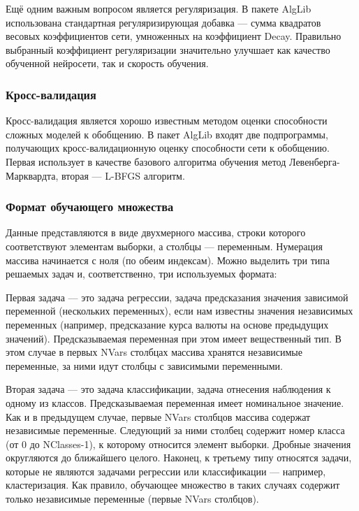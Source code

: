 Ещё одним важным вопросом является регуляризация. В пакете AlgLib использована
стандартная регуляризирующая добавка — сумма квадратов весовых коэффициентов
сети, умноженных на коэффициент Decay. Правильно выбранный коэффициент
регуляризации значительно улучшает как качество обученной нейросети, так и
скорость обучения.

\subsubsection{Кросс-валидация}

Кросс-валидация является хорошо известным методом оценки способности сложных
моделей к обобщению. В пакет AlgLib входят две подпрограммы, получающих
кросс-валидационную оценку способности сети к обобщению. Первая использует в
качестве базового алгоритма обучения метод Левенберга-Марквардта, вторая —
L-BFGS алгоритм.

\subsubsection{Формат обучающего множества}

Данные представляются в виде двухмерного массива, строки которого соответствуют
элементам выборки, а столбцы — переменным. Нумерация массива начинается с ноля
(по обеим индексам). Можно выделить три типа решаемых задач и, соответственно,
три используемых формата:

Первая задача — это задача регрессии, задача предсказания значения зависимой
переменной (нескольких переменных), если нам известны значения независимых
переменных (например, предсказание курса валюты на основе предыдущих значений).
Предсказываемая переменная при этом имеет вещественный тип. В этом случае в
первых NVars столбцах массива хранятся независимые переменные, за ними идут
столбцы с зависимыми переменными.

Вторая задача — это задача классификации, задача отнесения наблюдения к одному
из классов. Предсказываемая переменная имеет номинальное значение. Как и в
предыдущем случае, первые NVars столбцов массива содержат независимые
переменные. Следующий за ними столбец содержит номер класса (от 0 до
NClasses-1), к которому относится элемент выборки. Дробные значения округляются
до ближайшего целого.  Наконец, к третьему типу относятся задачи, которые не
являются задачами регрессии или классификации — например, кластеризация. Как
правило, обучающее множество в таких случаях содержит только независимые
переменные (первые NVars столбцов).

